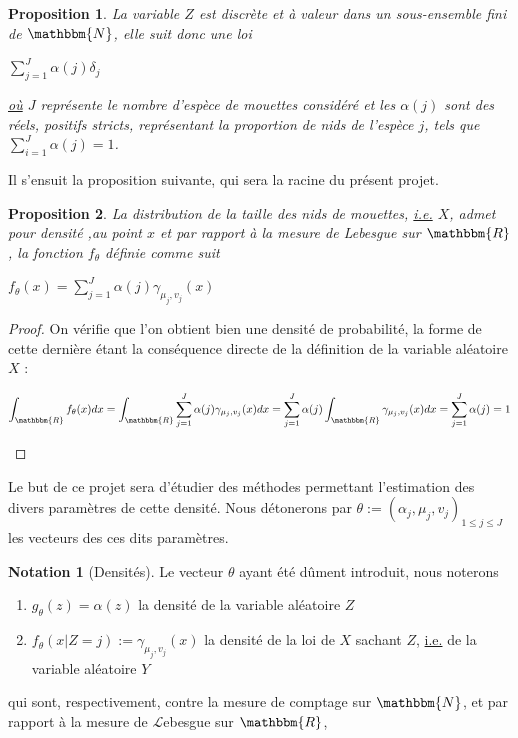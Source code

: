 \documentclass[frenchb]{report}
\newcommand{\R}{\mathbbm{R}}
\newcommand{\N}{\mathbbm{N}}
\newcommand{\1}{\mathbbm{1}}
\newtheorem{prop}{Proposition}
\theoremstyle{definition}\newtheorem{defn}{Définition}
\theoremstyle{definition}\newtheorem{exm}{Exemple}
\theoremstyle{definition}\newtheorem{nota}{Notation}
\theoremstyle{definition}\newtheorem{rem}{Remarque}
\begin{document}
\begin{prop}
La variable $Z$ est discrète et à valeur dans un sous-ensemble fini de $\N$, elle suit donc une loi 
\begin{center} $\displaystyle \sum_{j=1}^J \alpha(j)\delta_j$ \end{center}
\underline{où} $J$ représente le nombre d'espèce de mouettes considéré et les $\alpha(j)$ sont des réels, positifs stricts, représentant la proportion de nids de l'espèce $j$, tels que $\displaystyle\sum_{i=1}^J \alpha(j) = 1$.
\end{prop}

Il s'ensuit la proposition suivante, qui sera la racine du présent projet.
\begin{prop}
La distribution de la taille des nids de mouettes, \underline{i.e.} $X$, admet pour densité ,au point $x$ et par rapport à la mesure de Lebesgue sur $\R$, la fonction $f_ \theta$ définie comme suit
\begin{center} $f_\theta(x) = \displaystyle\sum_{j=1}^J \alpha(j) \gamma_{\mu_j, v_j}(x) $ \end{center}
\end{prop}

\begin{proof}
On vérifie que l'on obtient bien une densité de probabilité, la forme de cette dernière étant la conséquence directe de la définition de la variable aléatoire $X$ : \newline
\begin{center} $\displaystyle\int_\R f_\theta(x) dx = \int_\R\sum_{j=1}^J \alpha(j) \gamma_{\mu_j, v_j}(x)dx = \sum_{j=1}^J\alpha(j)\int_\R \gamma_{\mu_j, v_j}(x)dx = \sum_{j=1}^J\alpha(j) = 1$ \end{center}
\end{proof}

Le but de ce projet sera d'étudier des méthodes permettant l'estimation des divers paramètres de cette densité. Nous détonerons par $\theta := (\alpha_j, \mu_j, v_j)_{1\leq j\leq J}$ les vecteurs des ces dits paramètres.

\begin{nota}[Densités]
Le vecteur $\theta$ ayant été dûment introduit, nous noterons
\begin{enumerate}
	\item $g_\theta(z) = \alpha(z)$ la densité de la variable aléatoire $Z$
	\item $f_\theta(x | Z=j) := \gamma_{\mu_j, v_j}(x)$  la densité de la loi de $X$ sachant $Z$, \underline{i.e.} de la variable aléatoire $Y$
\end{enumerate}
qui sont, respectivement, contre la mesure de comptage sur $\N$, et par rapport à la mesure de $\mathcal{L}$ebesgue sur $\R$,
\end{nota}
\end{document}
